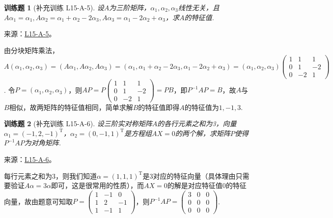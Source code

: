 \documentclass[12pt,fontset=fandol]{ctexart}
\newtheorem{exercise}{训练题}[section]
\begin{document}
\begin{exercise}[补充训练 L15-A-5]\label{prob:L15-A-5}
设$A$为三阶矩阵，$\alpha_1,\alpha_2,\alpha_3$线性无关，且$A\alpha_1=\alpha_1,A\alpha_2=\alpha_1+\alpha_2-2\alpha_3,A\alpha_3=\alpha_1-2\alpha_2+\alpha_3$，求$A$的特征值.
\end{exercise}
\noindent 来源：\href{https://github.com/yhwu-is/Linear-Algebra-Left-Undone/blob/new/%E8%AE%B2%E4%B9%89/%E4%B8%93%E9%A2%98/15%20%E7%9B%B8%E4%BC%BC%E6%A0%87%E5%87%86%E5%BD%A2%EF%BC%9A%E5%A4%8D%E6%95%B0%E5%9F%9F%E4%B8%8A%E7%9A%84%E5%B0%9D%E8%AF%95%E4%B8%8E%E7%90%86%E8%AE%BA.tex}{L15-A-5}。
\begin{solve}
由分块矩阵乘法，
\[A(\alpha_1,\alpha_2,\alpha_3)=(A\alpha_1,A\alpha_2,A\alpha_3)=(\alpha_1,\alpha_1+\alpha_2-2\alpha_3,\alpha_1-2\alpha_2+\alpha_3)=(\alpha_1,\alpha_2,\alpha_3)\begin{pmatrix}
                1 & 1 & 1 \\ 0 & 1 & -2 \\ 0 & -2 & 1
            \end{pmatrix}\]
. 令$P=(\alpha_1,\alpha_2,\alpha_3)$，则$AP=P\begin{pmatrix}
                1 & 1 & 1 \\ 0 & 1 & -2 \\ 0 & -2 & 1
            \end{pmatrix}=PB$，即$P^{-1}AP=B$，故$A$与$B$相似，故两矩阵的特征值相同，简单求解$B$的特征值即得$A$的特征值为$1,-1,3$.
\end{solve}

\begin{exercise}[补充训练 L15-A-6]\label{prob:L15-A-6}
设三阶实对称矩阵$A$的各行元素之和为3，向量$\alpha_1=(-1,2,-1)^\mathrm{T}$，$\alpha_2=(0,-1,1)^\mathrm{T}$是方程组$AX=0$的两个解，求矩阵$P$使得$P^{-1}AP$为对角矩阵.
\end{exercise}
\noindent 来源：\href{https://github.com/yhwu-is/Linear-Algebra-Left-Undone/blob/new/%E8%AE%B2%E4%B9%89/%E4%B8%93%E9%A2%98/15%20%E7%9B%B8%E4%BC%BC%E6%A0%87%E5%87%86%E5%BD%A2%EF%BC%9A%E5%A4%8D%E6%95%B0%E5%9F%9F%E4%B8%8A%E7%9A%84%E5%B0%9D%E8%AF%95%E4%B8%8E%E7%90%86%E8%AE%BA.tex}{L15-A-6}。
\begin{solve}
每行元素之和为3，则我们知道$\alpha=(1,1,1)^\mathrm{T}$是3对应的特征向量（具体理由只需要验证$A\alpha=3\alpha$即可，这是很常用的性质），而$AX=0$的解是对应特征值0的特征向量，故由题意可知取$P=\begin{pmatrix}
                1 & -1 & 0 \\ 1 & 2 & -1 \\ 1 & -1 & 1
            \end{pmatrix}$，则$P^{-1}AP=\begin{pmatrix}
                3 & 0 & 0 \\ 0 & 0 & 0 \\ 0 & 0 & 0
            \end{pmatrix}$.
\end{solve}
\end{document}
